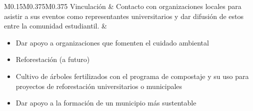 \begin{table}[H]
\begin{threeparttable}
{\begin{tabular}{M{0.15\linewidth}M{0.375\linewidth}M{0.375\linewidth}}
    Vinculación & Contacto con organizaciones locales para asistir a sus eventos como representantes universitarios y dar difusión de estos entre la comunidad estudiantil.
    &
    \begin{itemize}
        \item Dar apoyo a organizaciones que fomenten el cuidado ambiental
        \item Reforestación (a futuro)
        \item Cultivo de árboles fertilizados con el programa de compostaje y su uso para proyectos de reforestación universitarios o municipales
        \item Dar apoyo a la formación de un municipio más sustentable
    \end{itemize} \\

    \hline
\end{tabular}

}

\begin{tablenotes}\tiny %
    \item[1] 
\end{tablenotes}

\end{threeparttable}
\end{table}